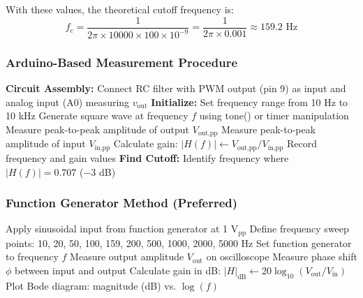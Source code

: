 With these values, the theoretical cutoff frequency is:
\begin{equation}
f_c = \frac{1}{2\pi \times 10000 \times 100 \times 10^{-9}} = \frac{1}{2\pi \times 0.001} \approx 159.2 \text{ Hz}
\end{equation}

\subsubsection{Arduino-Based Measurement Procedure}

\begin{algorithm}
\caption{RC Filter Frequency Response Measurement (Arduino)}
\begin{algorithmic}[1]
\State \textbf{Circuit Assembly:} Connect RC filter with PWM output (pin 9) as input and analog input (A0) measuring $v_{\text{out}}$
\State \textbf{Initialize:} Set frequency range from 10 Hz to 10 kHz
    \State Generate square wave at frequency $f$ using tone() or timer manipulation
    \State Measure peak-to-peak amplitude of output $V_{\text{out,pp}}$
    \State Measure peak-to-peak amplitude of input $V_{\text{in,pp}}$
    \State Calculate gain: $|H(f)| \gets V_{\text{out,pp}} / V_{\text{in,pp}}$
    \State Record frequency and gain values
\EndFor
\State \textbf{Find Cutoff:} Identify frequency where $|H(f)| = 0.707$ ($-3$ dB)
\end{algorithmic}
\end{algorithm}

\subsubsection{Function Generator Method (Preferred)}

\begin{algorithm}
\caption{RC Filter Frequency Response Measurement (Function Generator)}
\begin{algorithmic}[1]
\State Apply sinusoidal input from function generator at 1 V$_{\text{pp}}$
\State Define frequency sweep points: 10, 20, 50, 100, 159, 200, 500, 1000, 2000, 5000 Hz
    \State Set function generator to frequency $f$
    \State Measure output amplitude $V_{\text{out}}$ on oscilloscope
    \State Measure phase shift $\phi$ between input and output
    \State Calculate gain in dB: $|H|_{\text{dB}} \gets 20\log_{10}(V_{\text{out}}/V_{\text{in}})$
\EndFor
\State Plot Bode diagram: magnitude (dB) vs. $\log(f)$
\end{algorithmic}
\end{algorithm}

